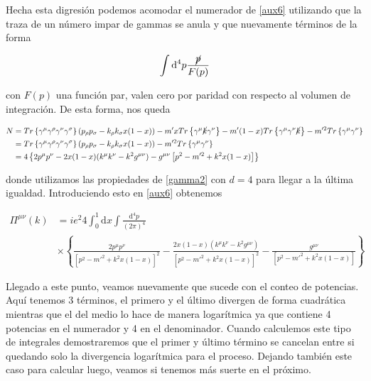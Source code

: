 \documentclass{article}
\numberwithin{equation}{section}
\begin{document}
Hecha esta digresión podemos acomodar el numerador de \ref{aux6} utilizando que la traza de un número impar de gammas se anula y que nuevamente términos de la forma 

\begin{equation}\label{key}
\int \mathrm{d^4}p \frac{\cancel{p}}{F(p)}
\end{equation}

con $ F(p) $ una función par, valen cero por paridad con respecto al volumen de integración. De esta forma, nos queda

\begin{equation}\label{key}
\begin{aligned}
N&=Tr\left\{\gamma^{\mu}\gamma^{\rho}\gamma^{\nu}\gamma^{\sigma}\right\} \left(p_{\rho}p_{\sigma} - k_{\rho}k_{\sigma}x(1-x)\right) - m'xTr\left\{\gamma^{\mu}\cancel{k}\gamma^{\nu}\right\} - m'(1-x)Tr\left\{\gamma^{\mu}\gamma^{\nu}\cancel{k}\right\} - m'^2 Tr\left\{\gamma^{\mu}\gamma^{\nu}\right\}\\
&=Tr\left\{\gamma^{\mu}\gamma^{\rho}\gamma^{\nu}\gamma^{\sigma}\right\} \left(p_{\rho}p_{\sigma} - k_{\rho}k_{\sigma}x(1-x)\right) - m'^2 Tr\left\{\gamma^{\mu}\gamma^{\nu}\right\}\\
&= 4\left\{2p^{\mu}p^{\nu}-2x(1-x)(k^{\mu}k^{\nu}-k^2g^{\mu\nu}) - g^{\mu\nu} \left[ p^2 - m'^2 + k^2x(1-x)\right]\right\}
\end{aligned}
\end{equation}

donde utilizamos las propiedades de \ref{gamma2} con $ d=4 $ para llegar a la última igualdad. Introduciendo esto en \ref{aux6} obtenemos


\begin{boxquation}
\begin{equation}\label{pi}
\begin{aligned}
\Pi^{\mu\nu}(k) &= i e^2 4 \int_0^1 \mathrm{d}x \int \frac{\mathrm{d^4}p}{(2\pi)^4}\\
&\times \left\{ \frac{2p^{\mu}p^{\nu}}{\left[p^2 -m'^2 + k^2x(1-x)\right]^2} - \frac{2x(1-x)(k^{\mu}k^{\nu}-k^2g^{\mu\nu})}{\left[p^2 -m'^2 + k^2x(1-x)\right]^2}-\frac{g^{\mu\nu}}{\left[ p^2 -m'^2 + k^2x(1-x)\right]} \right\} 
\end{aligned}   
\end{equation}
\end{boxquation}


Llegado a este punto, veamos nuevamente que sucede con el conteo de potencias. Aquí tenemos 3 términos, el primero y el último divergen de forma cuadrática mientras que el del medio lo hace de manera logarítmica ya que contiene 4 potencias en el numerador y 4 en el denominador. Cuando calculemos este tipo de integrales demostraremos que el primer y último término se cancelan entre si quedando solo la divergencia logarítmica para el proceso. Dejando también este caso para calcular luego, veamos si tenemos más suerte en el próximo.
\end{document}
